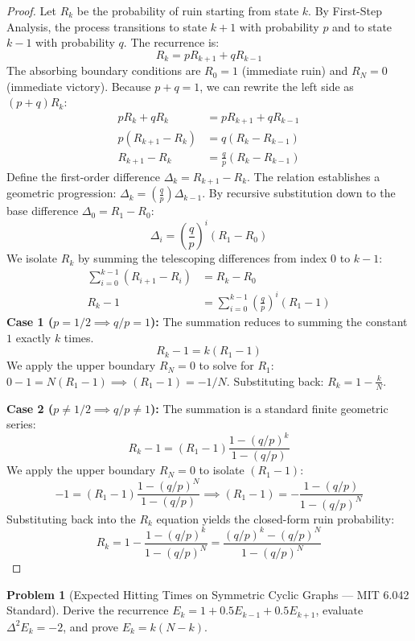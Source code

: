 \documentclass[11pt, a4paper]{article}
\theoremstyle{definition}
\newtheorem{problem}{Problem}
\theoremstyle{plain}
\begin{document}
\begin{proof}
Let $R_k$ be the probability of ruin starting from state $k$. By First-Step Analysis, the process transitions to state $k+1$ with probability $p$ and to state $k-1$ with probability $q$. The recurrence is:
\[
R_k = p R_{k+1} + q R_{k-1}
\]
The absorbing boundary conditions are $R_0 = 1$ (immediate ruin) and $R_N = 0$ (immediate victory).
Because $p + q = 1$, we can rewrite the left side as $(p + q)R_k$:
\begin{align*}
p R_k + q R_k &= p R_{k+1} + q R_{k-1} \\
p(R_{k+1} - R_k) &= q(R_k - R_{k-1}) \\
R_{k+1} - R_k &= \frac{q}{p} (R_k - R_{k-1})
\end{align*}
Define the first-order difference $\Delta_k = R_{k+1} - R_k$. The relation establishes a geometric progression: $\Delta_k = (\frac{q}{p}) \Delta_{k-1}$.
By recursive substitution down to the base difference $\Delta_0 = R_1 - R_0$:
\[
\Delta_i = \left(\frac{q}{p}\right)^i (R_1 - R_0)
\]
We isolate $R_k$ by summing the telescoping differences from index $0$ to $k-1$:
\begin{align*}
\sum_{i=0}^{k-1} (R_{i+1} - R_i) &= R_k - R_0 \\
R_k - 1 &= \sum_{i=0}^{k-1} \left(\frac{q}{p}\right)^i (R_1 - 1)
\end{align*}
\textbf{Case 1 ($p = 1/2 \implies q/p = 1$):} 
The summation reduces to summing the constant $1$ exactly $k$ times.
\[
R_k - 1 = k(R_1 - 1)
\]
We apply the upper boundary $R_N = 0$ to solve for $R_1$: $0 - 1 = N(R_1 - 1) \implies (R_1 - 1) = -1/N$.
Substituting back: $R_k = 1 - \frac{k}{N}$.

\textbf{Case 2 ($p \ne 1/2 \implies q/p \ne 1$):}
The summation is a standard finite geometric series:
\[
R_k - 1 = (R_1 - 1) \frac{1 - (q/p)^k}{1 - (q/p)}
\]
We apply the upper boundary $R_N = 0$ to isolate $(R_1 - 1)$:
\[
-1 = (R_1 - 1) \frac{1 - (q/p)^N}{1 - (q/p)} \implies (R_1 - 1) = - \frac{1 - (q/p)}{1 - (q/p)^N}
\]
Substituting back into the $R_k$ equation yields the closed-form ruin probability:
\[
R_k = 1 - \frac{1 - (q/p)^k}{1 - (q/p)^N} = \frac{(q/p)^k - (q/p)^N}{1 - (q/p)^N}
\]
\end{proof}

\vspace{0.5cm}

\begin{problem}[Expected Hitting Times on Symmetric Cyclic Graphs --- MIT 6.042 Standard]
Derive the recurrence $E_k = 1 + 0.5 E_{k-1} + 0.5 E_{k+1}$, evaluate $\Delta^2 E_k = -2$, and prove $E_k = k(N - k)$.
\end{problem}
\end{document}
